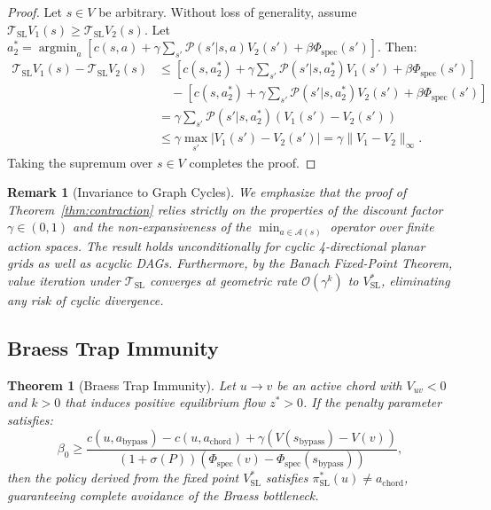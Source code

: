 \documentclass[11pt,a4paper]{article}
\newtheorem{theorem}{Theorem}
\newtheorem{remark}{Remark}
\begin{document}
\begin{proof}
Let $s \in V$ be arbitrary. Without loss of generality, assume $\mathcal{T}_{\text{SL}} V_1(s) \ge \mathcal{T}_{\text{SL}} V_2(s)$. Let $a_2^* = \operatorname{argmin}_a [ c(s, a) + \gamma \sum_{s'} \mathcal{P}(s'|s,a) V_2(s') + \beta \Phi_{\text{spec}}(s') ]$. Then:
\begin{align*}
\mathcal{T}_{\text{SL}} V_1(s) - \mathcal{T}_{\text{SL}} V_2(s) &\le \left[ c(s, a_2^*) + \gamma \sum_{s'} \mathcal{P}(s'|s, a_2^*) V_1(s') + \beta \Phi_{\text{spec}}(s') \right] \\
&\quad - \left[ c(s, a_2^*) + \gamma \sum_{s'} \mathcal{P}(s'|s, a_2^*) V_2(s') + \beta \Phi_{\text{spec}}(s') \right] \\
&= \gamma \sum_{s'} \mathcal{P}(s'|s, a_2^*) (V_1(s') - V_2(s')) \\
&\le \gamma \max_{s'} |V_1(s') - V_2(s')| = \gamma \|V_1 - V_2\|_\infty.
\end{align*}
Taking the supremum over $s \in V$ completes the proof.
\end{proof}

\begin{remark}[Invariance to Graph Cycles]
We emphasize that the proof of Theorem~\ref{thm:contraction} relies strictly on the properties of the discount factor $\gamma \in (0, 1)$ and the non-expansiveness of the $\min_{a \in \mathcal{A}(s)}$ operator over finite action spaces. The result holds unconditionally for cyclic 4-directional planar grids as well as acyclic DAGs. Furthermore, by the Banach Fixed-Point Theorem, value iteration under $\mathcal{T}_{\text{SL}}$ converges at geometric rate $\mathcal{O}(\gamma^k)$ to $V_{\text{SL}}^*$, eliminating any risk of cyclic divergence.
\end{remark}

\subsection{Braess Trap Immunity}
\begin{theorem}[Braess Trap Immunity]
\label{thm:immunity}
\label{thm:trap_immunity}
Let $u \to v$ be an active chord with $V_{uv} < 0$ and $k > 0$ that induces positive equilibrium flow $z^* > 0$. If the penalty parameter satisfies:
\begin{equation}
\beta_0 \ge \frac{c(u, a_{\text{bypass}}) - c(u, a_{\text{chord}}) + \gamma (V(s_{\text{bypass}}) - V(v))}{(1 + \sigma(P)) (\Phi_{\text{spec}}(v) - \Phi_{\text{spec}}(s_{\text{bypass}}))},
\end{equation}
then the policy derived from the fixed point $V_{\text{SL}}^*$ satisfies $\pi_{\text{SL}}^*(u) \ne a_{\text{chord}}$, guaranteeing complete avoidance of the Braess bottleneck.
\end{theorem}
\end{document}
